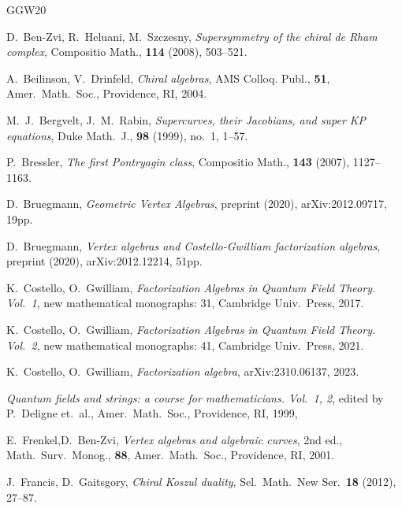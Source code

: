 \documentclass[final,reqno]{amsart}
\numberwithin{equation}{section}
\theoremstyle{definition}
\begin{document}
\begin{thebibliography}{GGW20}

D.\ Ben-Zvi, R.\ Heluani, M.\ Szczesny,
\emph{Supersymmetry of the chiral de Rham complex}, 
Compositio Math., \textbf{114} (2008), 503--521.

A.\ Beilinson, V.\ Drinfeld,
\textit{Chiral algebras}, 
AMS Colloq. Publ., \textbf{51}, 
Amer.\ Math.\ Soc., Providence, RI, 2004.

M.\ J.\ Bergvelt, J.\ M.\ Rabin, 
\emph{Supercurves, their Jacobians, and super KP equations}, 
Duke Math.\ J., \textbf{98} (1999), no.\ 1, 1--57.

P.\ Bressler,
\textit{The first Pontryagin class},
Compositio Math., \textbf{143} (2007), 1127--1163.

D.\ Bruegmann, 
\textit{Geometric Vertex Algebras},  
preprint (2020), arXiv:2012.09717, 19pp.

D.\ Bruegmann, 
\textit{Vertex algebras and Costello-Gwilliam factorization algebras},
preprint (2020), arXiv:2012.12214, 51pp.

K.\ Costello, O.\ Gwilliam, 
\textit{Factorization Algebras in Quantum Field Theory. Vol.\ 1},
new mathematical monographs: 31,
Cambridge Univ.\ Press, 2017.

K.\ Costello, O.\ Gwilliam, 
\textit{Factorization Algebras in Quantum Field Theory. Vol.\ 2},
new mathematical monographs: 41,
Cambridge Univ.\ Press, 2021.

K.\ Costello, O.\ Gwilliam, 
\textit{Factorization algebra}, arXiv:2310.06137, 2023.

\textit{Quantum fields and strings: a course for mathematicians. Vol.\ 1, 2}, 
edited by P.\ Deligne et.\ al.,
Amer.\ Math.\ Soc., Providence, RI, 1999, 

E.\ Frenkel,D.\ Ben-Zvi,
\textit{Vertex algebras and algebraic curves}, 2nd ed., 
Math.\ Surv.\ Monog., \textbf{88}, 
Amer.\ Math.\ Soc., Providence, RI, 2001.

J.\ Francis, D.\ Gaitsgory, 
\textit{Chiral Koszul duality}, 
Sel.\ Math.\ New Ser.\ \textbf{18} (2012), 27--87.


\end{thebibliography}
\end{document}
